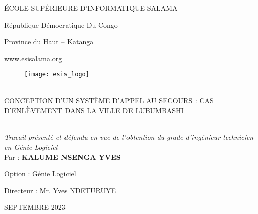 \begin{titlepage}
	\begin{center}
		\large
		ÉCOLE SUPÉRIEURE D’INFORMATIQUE SALAMA
		
		\vspace{1.25pt}
		République Démocratique Du Congo
		
		Province du Haut – Katanga
		
		www.esisalama.org
		
		\vspace{0.5cm}
		
		\begin{figure}[h]
			\texttt{[image: esis\_logo]}
			\centering
		\end{figure}
		
		\vspace{0.5cm}
		\hrulefill\\[0.5cm]
		CONCEPTION D'UN SYSTÈME D’APPEL AU SECOURS : CAS D'ENLÈVEMENT DANS LA VILLE DE LUBUMBASHI\\
		\hrulefill\\[1cm]
		
		\vspace{0.5cm}		
		\hfill
		\begin{minipage}{0.5\textwidth}
			
			\textit{Travail présenté et défendu en vue de l’obtention du grade d’ingénieur technicien en Génie Logiciel}\\
			
			Par : \textbf{KALUME NSENGA YVES}
			
			Option : Génie Logiciel
			
			Directeur : Mr. Yves NDETURUYE
		\end{minipage}
		
		\vfill
		SEPTEMBRE 2023
	\end{center}
\end{titlepage}